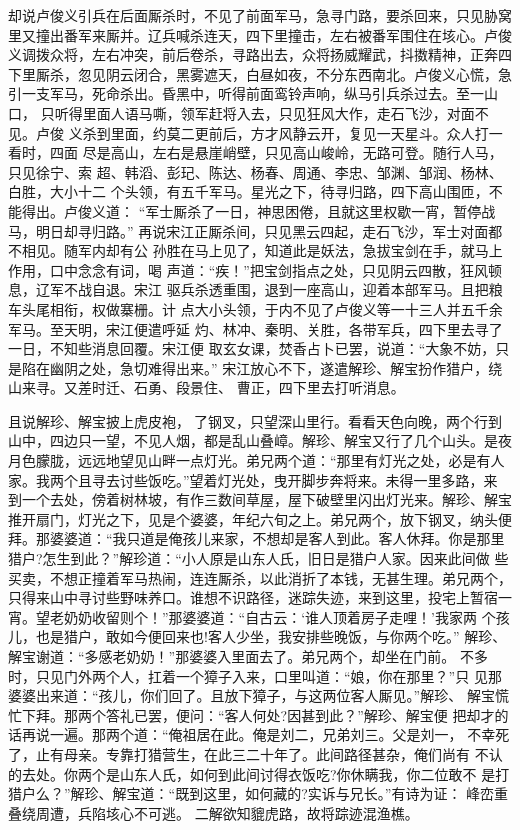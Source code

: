 却说卢俊义引兵在后面厮杀时，不见了前面军马，急寻门路，要杀回来，只见胁窝
里又撞出番军来厮并。辽兵喊杀连天，四下里撞击，左右被番军围住在垓心。卢俊
义调拨众将，左右冲突，前后卷杀，寻路出去，众将扬威耀武，抖擞精神，正奔四
下里厮杀，忽见阴云闭合，黑雾遮天，白昼如夜，不分东西南北。卢俊义心慌，急
引一支军马，死命杀出。昏黑中，听得前面鸾铃声响，纵马引兵杀过去。至一山口，
只听得里面人语马嘶，领军赶将入去，只见狂风大作，走石飞沙，对面不见。卢俊
义杀到里面，约莫二更前后，方才风静云开，复见一天星斗。众人打一看时，四面
尽是高山，左右是悬崖峭壁，只见高山峻岭，无路可登。随行人马，只见徐宁、索
超、韩滔、彭玘、陈达、杨春、周通、李忠、邹渊、邹润、杨林、白胜，大小十二
个头领，有五千军马。星光之下，待寻归路，四下高山围匝，不能得出。卢俊义道：
“军士厮杀了一日，神思困倦，且就这里权歇一宵，暂停战马，明日却寻归路。”
再说宋江正厮杀间，只见黑云四起，走石飞沙，军士对面都不相见。随军内却有公
孙胜在马上见了，知道此是妖法，急拔宝剑在手，就马上作用，口中念念有词，喝
声道：“疾！”把宝剑指点之处，只见阴云四散，狂风顿息，辽军不战自退。宋江
驱兵杀透重围，退到一座高山，迎着本部军马。且把粮车头尾相衔，权做寨栅。计
点大小头领，于内不见了卢俊义等一十三人并五千余军马。至天明，宋江便遣呼延
灼、林冲、秦明、关胜，各带军兵，四下里去寻了一日，不知些消息回覆。宋江便
取玄女课，焚香占卜已罢，说道：“大象不妨，只是陷在幽阴之处，急切难得出来。”
宋江放心不下，遂遣解珍、解宝扮作猎户，绕山来寻。又差时迁、石勇、段景住、
曹正，四下里去打听消息。

且说解珍、解宝披上虎皮袍，了钢叉，只望深山里行。看看天色向晚，两个行到
山中，四边只一望，不见人烟，都是乱山叠嶂。解珍、解宝又行了几个山头。是夜
月色朦胧，远远地望见山畔一点灯光。弟兄两个道：“那里有灯光之处，必是有人
家。我两个且寻去讨些饭吃。”望着灯光处，曳开脚步奔将来。未得一里多路，来
到一个去处，傍着树林坡，有作三数间草屋，屋下破壁里闪出灯光来。解珍、解宝
推开扇门，灯光之下，见是个婆婆，年纪六旬之上。弟兄两个，放下钢叉，纳头便
拜。那婆婆道：“我只道是俺孩儿来家，不想却是客人到此。客人休拜。你是那里
猎户?怎生到此？”解珍道：“小人原是山东人氏，旧日是猎户人家。因来此间做
些买卖，不想正撞着军马热闹，连连厮杀，以此消折了本钱，无甚生理。弟兄两个，
只得来山中寻讨些野味养口。谁想不识路径，迷踪失迹，来到这里，投宅上暂宿一
宵。望老奶奶收留则个！”那婆婆道：“自古云：‘谁人顶着房子走哩！’我家两
个孩儿，也是猎户，敢如今便回来也!客人少坐，我安排些晚饭，与你两个吃。”
解珍、解宝谢道：“多感老奶奶！”那婆婆入里面去了。弟兄两个，却坐在门前。
不多时，只见门外两个人，扛着一个獐子入来，口里叫道：“娘，你在那里？”只
见那婆婆出来道：“孩儿，你们回了。且放下獐子，与这两位客人厮见。”解珍、
解宝慌忙下拜。那两个答礼已罢，便问：“客人何处?因甚到此？”解珍、解宝便
把却才的话再说一遍。那两个道：“俺祖居在此。俺是刘二，兄弟刘三。父是刘一，
不幸死了，止有母亲。专靠打猎营生，在此三二十年了。此间路径甚杂，俺们尚有
不认的去处。你两个是山东人氏，如何到此间讨得衣饭吃?你休瞒我，你二位敢不
是打猎户么？”解珍、解宝道：“既到这里，如何藏的?实诉与兄长。”有诗为证：
峰峦重叠绕周遭，兵陷垓心不可逃。
二解欲知貔虎路，故将踪迹混渔樵。

